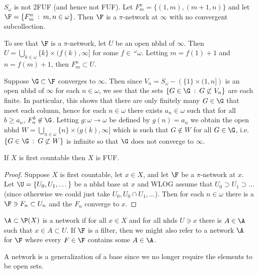 \documentclass{article}
\begin{document}
\begin{exam}
    \(S_{\omega}\) is not 2FUF (and hence not FUF). Let \(F_m^n = \{(1, m), (m + 1, n)\}\) and let \(\F = \{F_m^n \: : \: m,n \in \omega\}\). Then \(\F\) is a \(\pi\)-network at \(\infty\) with no convergent subcollection. 
    
    To see that \(\F\) is a \(\pi\)-network, let \(U\) be an open nbhd of \(\infty\). Then \(U = \bigcup_{k \in \omega} \{k\} \times (f(k), \infty]\) for some \(f \in \, ^{\omega}\omega\). Letting \(m = f(1) + 1\) and \(n = f(m) + 1\), then \(F_m^n \subset U\).

    Suppose \(\G \subset \F\) converges to \(\infty\). Then since \(V_n = S_{\omega}- \left(\{1\} \times (1, n]\right)\) is an open nbhd of \(\infty\) for each \(n \in \omega\), we see that the sets \(\{G \in \G \: : \: G \not \subset V_n\}\) are each finite. In particular, this shows that there are only finitely many \(G \in \G\) that meet each column, hence for each \(n \in \omega\) there exists \(a_n \in \omega\) such that for all \(b \geq a_n\), \(F_n^b \not \in \G\). Letting \(g:\omega \to \omega\) be defined by \(g(n) = a_n\) we obtain the open nbhd \(W = \bigcup_{n \in \omega} \{n\} \times (g(k), \infty]\) which is such that \(G \not \in W\) for all \(G \in \G\), i.e. \(\{G \in \G \: : \: G \not \subset W\}\) is infinite so that \(\G\) does not converge to \(\infty\).
\end{exam}
\begin{prop}
    If \(X\) is first countable then \(X\) is FUF.
\end{prop}
\begin{proof}
    Suppose \(X\) is first countable, let \(x \in X\), and let \(\F\) be a \(\pi\)-network at \(x\). Let \(\U = \{U_0, U_1, \dots\}\) be a nbhd base at \(x\) and WLOG assume  that \(U_0 \supset U_1 \supset \dots\) (since otherwise we could just take \(U_0, U_0\cap U_1, \dots\)). Then for each \(n \in \omega\) there is a \(\F \ni F_n \subset U_n\) and the \(F_n\) converge to \(x\).
\end{proof}
\begin{defn}
    \(\A \subset \P(X)\) is a network if for all \(x \in X\) and for all nhds \(U \ni x\) there is \(A \in \A\) such that \(x \in A \subset U\). If \(\F\) is a filter, then we might also refer to a network \(\A\) for \(\F\) where every \(F \in \F\) contains some \(A \in \A\).
\end{defn}
\begin{rem}
    A network is a generalization of a base since we no longer require the elements to be open sets.
\end{rem}
\end{document}
